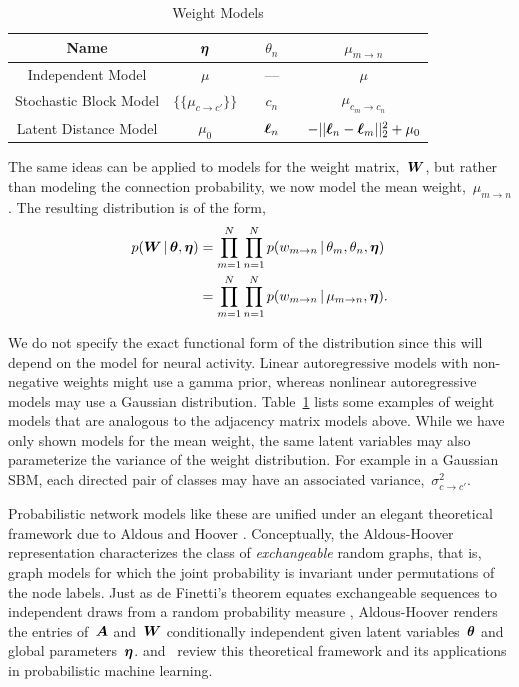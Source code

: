 \begin{table}
\begin{center}
\begin{tabular}{c|c|c|c}
Name & $\boldsymbol{\eta}$ & $\quad \theta_n \quad$ & $\mu_{m \to n}$ \\
\hline
Independent Model & $\mu$ & --- & $\mu$ \\
Stochastic Block Model & $\{\{ \mu_{c \to c'} \}\}$ & $c_n$ & $\mu_{c_m \to c_n}$ \\
Latent Distance Model & $\mu_0$ & $\boldsymbol{\ell}_n$ & $-||\boldsymbol{\ell}_n - \boldsymbol{\ell}_m||_2^2 + \mu_0$ 
\end{tabular}
\end{center}
\caption{Weight Models}
\label{tab:W_models}
\end{table}

The same ideas can be applied to models for the weight matrix,~$\boldsymbol{W}$,
but rather than modeling the connection probability, we now model the
mean weight,~$\mu_{m \to n}$. The resulting distribution is of the form,
\begin{align*}
  p(\boldsymbol{W} \,|\, \boldsymbol{\theta}, \boldsymbol{\eta})
  &= \prod_{m=1}^N \prod_{n=1}^N p(w_{m \to n} \,|\, \theta_m, \theta_n, \boldsymbol{\eta}) \\
  &= \prod_{m=1}^N \prod_{n=1}^N p(w_{m \to n} \,|\, \mu_{m \to n}, \boldsymbol{\eta}).
\end{align*}

We do not specify the exact functional form of the distribution since
this will depend on the model for neural activity. Linear
autoregressive models with non-negative weights might use a gamma
prior, whereas nonlinear autoregressive models may use a Gaussian
distribution. Table~\ref{tab:W_models} lists some examples of weight
models that are analogous to the adjacency matrix models above.
While we have only shown models for the mean weight,
the same latent variables may
also parameterize the variance of the weight distribution. For example
in a Gaussian SBM, each directed pair of classes may have an
associated variance,~$\sigma^2_{c \to c'}$.


Probabilistic network models like these are unified under an elegant
theoretical framework due to Aldous and Hoover
\cite{Aldous-1981,Hoover-1979}. Conceptually, the Aldous-Hoover
representation characterizes the class of \textit{exchangeable} random
graphs, that is, graph models for which the joint probability is
invariant under permutations of the node labels. Just as de Finetti's
theorem equates exchangeable sequences to independent draws from a
random probability measure
, Aldous-Hoover renders the entries of~$\boldsymbol{A}$ and~$\boldsymbol{W}$ conditionally
independent given latent variables~$\boldsymbol{\theta}$ and global
parameters~$\boldsymbol{\eta}$. \citet{Lloyd-2012} and~\citet{orbanz2015bayesian}
review this theoretical framework and its applications in
probabilistic machine learning.

